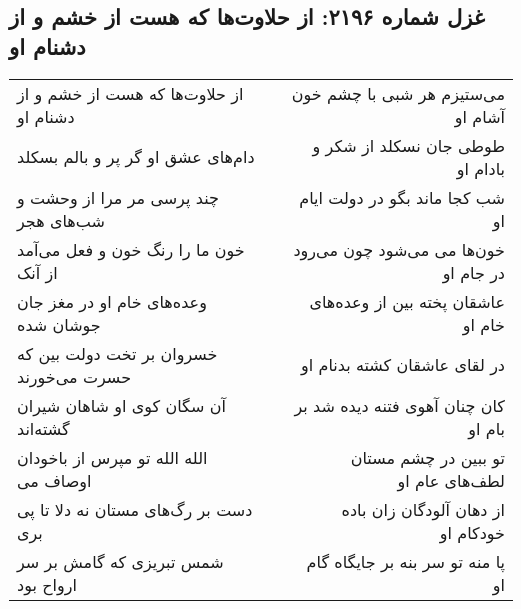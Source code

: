 \begin{center}
\section*{غزل شماره ۲۱۹۶: از حلاوت‌ها که هست از خشم و از دشنام او}
\label{sec:2196}
\begin{longtable}{l p{0.5cm} r}
از حلاوت‌ها که هست از خشم و از دشنام او
&&
می‌ستیزم هر شبی با چشم خون آشام او
\\
دام‌های عشق او گر پر و بالم بسکلد
&&
طوطی جان نسکلد از شکر و بادام او
\\
چند پرسی مر مرا از وحشت و شب‌های هجر
&&
شب کجا ماند بگو در دولت ایام او
\\
خون ما را رنگ خون و فعل می‌آمد از آنک
&&
خون‌ها می می‌شود چون می‌رود در جام او
\\
وعده‌های خام او در مغز جان جوشان شده
&&
عاشقان پخته بین از وعده‌های خام او
\\
خسروان بر تخت دولت بین که حسرت می‌خورند
&&
در لقای عاشقان کشته بدنام او
\\
آن سگان کوی او شاهان شیران گشته‌اند
&&
کان چنان آهوی فتنه دیده شد بر بام او
\\
الله الله تو مپرس از باخودان اوصاف می
&&
تو ببین در چشم مستان لطف‌های عام او
\\
دست بر رگ‌های مستان نه دلا تا پی بری
&&
از دهان آلودگان زان باده خودکام او
\\
شمس تبریزی که گامش بر سر ارواح بود
&&
پا منه تو سر بنه بر جایگاه گام او
\\
\end{longtable}
\end{center}
